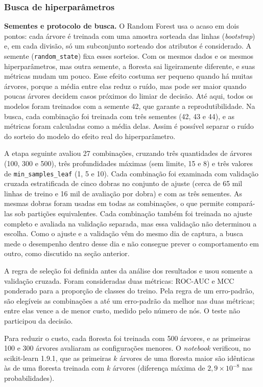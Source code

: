 \documentclass[
    12pt,                %
    openright,           %
    oneside,             %
    a4paper,             %
    english,             %
    brazil               %
]{abntex2}
\begin{document}
\subsubsection{Busca de hiperparâmetros}
\label{sec:rf-bin-busca}

\textbf{Sementes e protocolo de busca.} O Random Forest usa o acaso em dois pontos: cada árvore é treinada com uma amostra sorteada das linhas (\textit{bootstrap}) e, em cada divisão, só um subconjunto sorteado dos atributos é considerado. A semente (\texttt{random\_state}) fixa esses sorteios. Com os mesmos dados e os mesmos hiperparâmetros, mas outra semente, a floresta sai ligeiramente diferente, e suas métricas mudam um pouco. Esse efeito costuma ser pequeno quando há muitas árvores, porque a média entre elas reduz o ruído, mas pode ser maior quando poucas árvores decidem casos próximos do limiar de decisão. Até aqui, todos os modelos foram treinados com a semente 42, que garante a reprodutibilidade. Na busca, cada combinação foi treinada com três sementes (42, 43 e 44), e as métricas foram calculadas como a média delas. Assim é possível separar o ruído do sorteio do modelo do efeito real do hiperparâmetro.

A etapa seguinte avaliou 27 combinações, cruzando três quantidades de árvores (100, 300 e 500), três profundidades máximas (sem limite, 15 e 8) e três valores de \texttt{min\_samples\_leaf} (1, 5 e 10). Cada combinação foi examinada com validação cruzada estratificada de cinco dobras no conjunto de ajuste (cerca de 65 mil linhas de treino e 16 mil de avaliação por dobra) e com as três sementes. As mesmas dobras foram usadas em todas as combinações, o que permite compará-las sob partições equivalentes. Cada combinação também foi treinada no ajuste completo e avaliada na validação separada, mas essa validação não determinou a escolha. Como o ajuste e a validação vêm do mesmo dia de captura, a busca mede o desempenho dentro desse dia e não consegue prever o comportamento em outro, como discutido na seção anterior.

A regra de seleção foi definida antes da análise dos resultados e usou somente a validação cruzada. Foram consideradas duas métricas: ROC-AUC e MCC ponderado para a proporção de classes do treino. Pela regra de um erro-padrão, são elegíveis as combinações a até um erro-padrão da melhor nas duas métricas; entre elas vence a de menor custo, medido pelo número de nós. O teste não participou da decisão.

Para reduzir o custo, cada floresta foi treinada com 500 árvores, e as primeiras 100 e 300 árvores avaliaram as configurações menores. O \textit{notebook} verificou, no scikit-learn 1.9.1, que as primeiras $k$ árvores de uma floresta maior são idênticas às de uma floresta treinada com $k$ árvores (diferença máxima de $2{,}9\times10^{-8}$ nas probabilidades).
\end{document}
